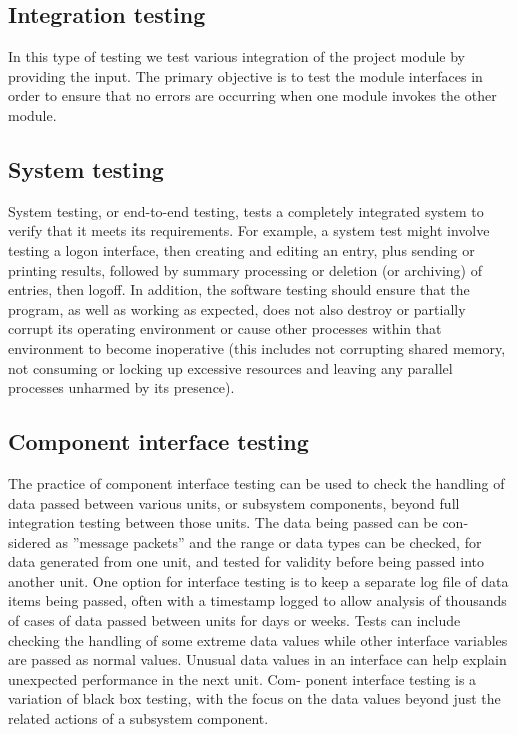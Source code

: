 \documentclass{article}
\begin{document}
\subsection{Integration testing}
In this type of testing we test various integration of the project module by providing the input. The primary objective is to test the module interfaces in order to ensure that no errors are occurring when one module invokes the other module.

\subsection{System testing}
System testing, or end-to-end testing, tests a completely integrated system to verify that it meets its requirements. For example, a system test might involve testing a logon interface, then creating and editing an entry, plus sending or printing results, followed by summary processing or deletion (or archiving) of entries, then logoff.
In addition, the software testing should ensure that the program, as well as working as expected, does not also destroy or partially corrupt its operating environment or cause other processes within that environment to become inoperative (this includes not corrupting shared memory, not consuming or locking up excessive resources and leaving any parallel processes unharmed by its presence).

\subsection{Component interface testing}
The practice of component interface testing can be used to check the handling of data passed between various units, or subsystem components, beyond full integration testing between those units. The data being passed can be con- sidered as ”message packets” and the range or data types can be checked, for data generated from one unit, and tested for validity before being passed into another unit. One option for interface testing is to keep a separate log file of data items being passed, often with a timestamp logged to allow analysis of thousands of cases of data passed between units for days or weeks. Tests can include checking the handling of some extreme data values while other interface variables are passed as normal values. Unusual data values in an interface can help explain unexpected performance in the next unit. Com- ponent interface testing is a variation of black box testing, with the focus on the data values beyond just the related actions of a subsystem component.
\end{document}
